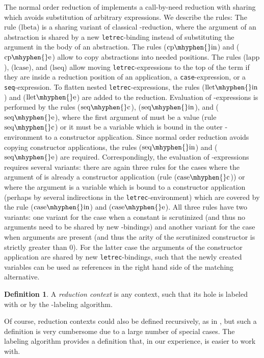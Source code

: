 \documentclass{LMCS}
\theoremstyle{plain}
\theoremstyle{definition}
\newtheorem{definition}[thm]{Definition}
\newcommand{\redrule}[1]{{\ensuremath{\mathrm{{#1}}}}}
\newcommand{\rlapp}{\redrule{lapp}}
\newcommand{\rlcase}{\redrule{lcase}}
\newcommand{\rlseq}{\redrule{lseq}}
\newcommand{\rcpin}{\redrule{cp\mhyphen{}in}}
\newcommand{\rcpe}{\redrule{cp\mhyphen{}e}}
\newcommand{\rlbeta}{\redrule{lbeta}}
\newcommand{\rlletin}{\redrule{llet\mhyphen{}in}}
\newcommand{\rllete}{\redrule{llet\mhyphen{}e}}
\newcommand{\rcasec}{\redrule{case\mhyphen{}c}}
\newcommand{\rcasein}{\redrule{case\mhyphen{}in}}
\newcommand{\rcasee}{\redrule{case\mhyphen{}e}}
\newcommand{\rseqc}{\redrule{seq\mhyphen{}c}}
\newcommand{\rseqin}{\redrule{seq\mhyphen{}in}}
\newcommand{\rseqe}{\redrule{seq\mhyphen{}e}}
\newcommand{\tletrec}{{\tt letrec}}
\newcommand{\tcase}{{\tt case}}
\newcommand{\tseq}{{\tt seq}}
\begin{document}
The normal order reduction of  implements a call-by-need reduction with sharing
which avoids substitution of arbitrary expressions.
We describe the rules: 
The rule (\rlbeta) is a sharing variant of classical -reduction,
where the argument of an abstraction is shared by a new \tletrec-binding 
instead of substituting the argument in the body of an abstraction. 
The rules (\rcpin) and (\rcpe) allow to copy abstractions into needed positions. 
The rules (\rlapp), (\rlcase), and (\rlseq) allow moving \tletrec-expressions 
to the top of the term if they are inside a reduction position of an application,
a \tcase-expression, or a \tseq-expression. 
To flatten nested \tletrec-expressions, the rules (\rlletin) and (\rllete) are
added to the reduction.
Evaluation of -expressions is performed by the rules (\rseqc), (\rseqin),
and (\rseqe), where the first argument of  must be a value (rule \rseqc)
or it must be a variable which is bound in the outer -environment to
a constructor application.
Since normal order reduction avoids copying constructor applications, the rules
(\rseqin) and (\rseqe) are required.
Correspondingly, the evaluation of -expressions requires several variants: 
there are again three rules for the cases where the argument of  is 
already a constructor application (rule (\rcasec)) or where the argument is a
variable which is bound to a constructor application (perhaps by several 
indirections in the \tletrec-environment) which are covered by the rule 
(\rcasein) and (\rcasee). 
All three rules have two variants: one variant for the case when a constant
is scrutinized (and thus no arguments need to be shared by new -bindings)
and another variant for the case when arguments are present (and thus the arity of
the scrutinized constructor is strictly greater than 0). 
For the latter case the arguments of the constructor application are shared by
new \tletrec-bindings, such that the newly created variables can be used as 
references in the right hand side of the matching alternative.


\begin{definition}
A {\em reduction context}  is any context, such that its hole is 
labeled with  or  by the -labeling algorithm. 
\end{definition}
Of course, reduction contexts could also be defined recursively, as 
in \cite[Definition 1.5]{schmidt-schauss-schuetz-sabel:08}, but such a 
definition is very cumbersome due to a large number of special cases. 
The labeling algorithm provides a definition that, in our experience,
is easier to work with.
 
\end{document}
